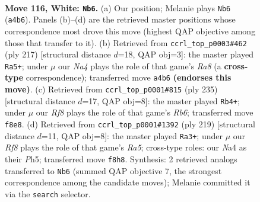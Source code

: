 \documentclass[11pt]{article}
\begin{document}
\clearpage

\begin{figure}[p]\centering
\begin{subfigure}{0.46\textwidth}\centering
\resizebox{\linewidth}{!}{%
\newchessgame
\chessboard[
  setfen={5R2/6p1/5pk1/7p/N6P/6PK/r7/8 w - - 56 116},
  showmover=false,
  pgfstyle=straightmove, color=movearrow, markmove={a4-b6}
]}
\caption{}
\end{subfigure}\hfill
\begin{subfigure}{0.46\textwidth}\centering
\resizebox{\linewidth}{!}{%
\newchessgame
\chessboard[
  setfen={8/5pk1/7p/5K1P/5PP1/1R6/8/r7 b - - 24 109},
  showmover=false,
  pgfstyle=straightmove, color=movearrow, markmove={a1-a5}
]}
\caption{}
\end{subfigure}
\\[4pt]
\begin{subfigure}{0.46\textwidth}\centering
\resizebox{\linewidth}{!}{%
\newchessgame
\chessboard[
  setfen={8/5pk1/5p2/2R4P/5KP1/1r3P2/8/8 b - - 70 118},
  showmover=false,
  pgfstyle=straightmove, color=movearrow, markmove={b3-b4}
]}
\caption{}
\end{subfigure}\hfill
\begin{subfigure}{0.46\textwidth}\centering
\resizebox{\linewidth}{!}{%
\newchessgame
\chessboard[
  setfen={1R6/5pk1/6p1/7p/r6P/5KP1/5P2/8 b - - 38 110},
  showmover=false,
  pgfstyle=straightmove, color=movearrow, markmove={a4-a3}
]}
\caption{}
\end{subfigure}
\caption{\textbf{Move 116, White: \texttt{Nb6}.} (a) Our position; Melanie plays \texttt{Nb6} (\texttt{a4b6}). Panels (b)--(d) are the retrieved master positions whose correspondence most drove this move (highest QAP objective among those that transfer to it). (b) Retrieved from \texttt{ccrl\_top\_p0003\#462} (ply 217) [structural distance $d$=18, QAP obj=3]: the master played \texttt{Ra5+}; under $\mu$ our \emph{Na4} plays the role of that game's \emph{Ra8} (a \textbf{cross-type} correspondence); transferred move \texttt{a4b6} \textbf{(endorses this move)}. (c) Retrieved from \texttt{ccrl\_top\_p0001\#815} (ply 235) [structural distance $d$=17, QAP obj=8]: the master played \texttt{Rb4+}; under $\mu$ our \emph{Rf8} plays the role of that game's \emph{Rb6}; transferred move \texttt{f8e8}. (d) Retrieved from \texttt{ccrl\_top\_p0001\#1392} (ply 219) [structural distance $d$=11, QAP obj=8]: the master played \texttt{Ra3+}; under $\mu$ our \emph{Rf8} plays the role of that game's \emph{Ra5}; cross-type roles: our \emph{N}a4 as their \emph{P}h5; transferred move \texttt{f8h8}. Synthesis: 2 retrieved analogs transferred to \texttt{Nb6} (summed QAP objective 7, the strongest correspondence among the candidate moves); Melanie committed it via the \texttt{search} selector.}
\label{fig:thought-m230}
\end{figure}
\end{document}
